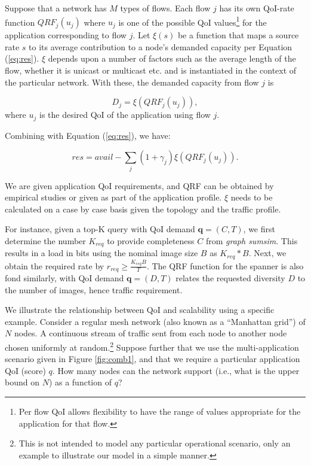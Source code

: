 


Suppose that a network has $M$ types of flows. Each flow $j$ has its own
QoI-rate function $QRF_j(u_j)$ where $u_j$ is one of the possible QoI
values\footnote{Per flow QoI allows flexibility to have the range of
values appropriate for the application for that flow.}
for the application corresponding to flow $j$. Let $\xi(s)$ be a function that
maps a source rate $s$ to its average contribution to a node's demanded
capacity per Equation (\ref{eq:res}).
$\xi$ depends upon a number of factors such as the
average length of the flow, whether it is unicast or multicast etc. and
is instantiated in the context of the particular network.
With these, the demanded capacity from flow $j$ is

\begin{equation}
D_j = \xi(QRF_j(u_j)),
\end{equation}
where $u_j$ is the desired QoI of the application using flow $j$.

Combining with Equation (\ref{eq:res}), we have:

\begin{equation}
res = avail - \sum_j (1+\gamma_j)\xi(QRF_j(u_j))   \label{eq:utility}.
\end{equation}

We are given application QoI requirements, and QRF can be obtained by
empirical studies or given as part of the application profile.
$\xi$ needs to be calculated on a case by case basis
given the topology and the traffic profile.

For instance, given a top-K query with QoI demand $\textbf{q}=(C,T)$, we first determine the number $K_{req}$ to provide completeness $C$ from \emph{graph sumsim}. This results in a load in bits using the nominal image size $B$ as $K_{req}*B$. Next, we obtain the required rate by $r_{req}\geq \frac{K_{req}B}{T}$. The QRF function for the spanner is also fond similarly, with QoI demand $\textbf{q}=(D,T)$ relates the requested diversity $D$ to the number of images, hence traffic requirement.


We illustrate the relationship between QoI and scalability using a
 specific example.  Consider a
regular mesh network (also known as a ``Manhattan grid'') of $N$ nodes.
A continuous stream of traffic sent from each node to another node chosen
uniformly at random.\footnote{This is not
intended to model any particular operational scenario, only an
example to illustrate our model in a simple manner.}  Suppose
further that we use the multi-application scenario given in Figure
\ref{fig:comb1}, and that we
require a particular application QoI (score) $q$.  How
many nodes can the network support (i.e., what is the upper bound on
$N$) as a function of $q$?

